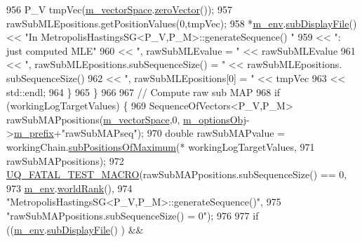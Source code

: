 \begin{DoxyCode}
956         P\_V tmpVec(\hyperlink{class_q_u_e_s_o_1_1_metropolis_hastings_s_g_a2ef17fbfc6a156f03bbfad044b5a75f5}{m\_vectorSpace}.\hyperlink{class_q_u_e_s_o_1_1_vector_space_a92e963bb5cab3eecd290dfe4b8f03b04}{zeroVector}());
957         rawSubMLEpositions.getPositionValues(0,tmpVec);
958         *\hyperlink{class_q_u_e_s_o_1_1_metropolis_hastings_s_g_ac8ea061e55b920e0c8f9bce5c3f20e52}{m\_env}.\hyperlink{class_q_u_e_s_o_1_1_base_environment_a8a0064746ae8dddfece4229b9ad374d6}{subDisplayFile}() << \textcolor{stringliteral}{"In MetropolisHastingsSG<P\_V,P\_M>::generateSequence()
      "}
959                                 << \textcolor{stringliteral}{": just computed MLE"}
960                                 << \textcolor{stringliteral}{", rawSubMLEvalue = "}                       << rawSubMLEvalue
961                                 << \textcolor{stringliteral}{", rawSubMLEpositions.subSequenceSize() = "} << rawSubMLEpositions.
      subSequenceSize()
962                                 << \textcolor{stringliteral}{", rawSubMLEpositions[0] = "}                << tmpVec
963                                 << std::endl;
964       \}
965     \}
966 
967     \textcolor{comment}{// Compute raw sub MAP}
968     \textcolor{keywordflow}{if} (workingLogTargetValues) \{
969       SequenceOfVectors<P\_V,P\_M> rawSubMAPpositions(\hyperlink{class_q_u_e_s_o_1_1_metropolis_hastings_s_g_a2ef17fbfc6a156f03bbfad044b5a75f5}{m\_vectorSpace},0,
      \hyperlink{class_q_u_e_s_o_1_1_metropolis_hastings_s_g_a5d0bc9f73d50d272aa6bfb5ef5939ef3}{m\_optionsObj}->\hyperlink{class_q_u_e_s_o_1_1_metropolis_hastings_s_g_options_a4f7c510aaa530336d24259e2a89f5d0b}{m\_prefix}+\textcolor{stringliteral}{"rawSubMAPseq"});
970       \textcolor{keywordtype}{double} rawSubMAPvalue = workingChain.\hyperlink{class_q_u_e_s_o_1_1_base_vector_sequence_a971e9e1a87e4eb47b4910348a6b437d5}{subPositionsOfMaximum}(*
      workingLogTargetValues,
971                                                                  rawSubMAPpositions);
972       \hyperlink{_defines_8h_a56d63d18d0a6d45757de47fcc06f574d}{UQ\_FATAL\_TEST\_MACRO}(rawSubMAPpositions.subSequenceSize() == 0,
973                           \hyperlink{class_q_u_e_s_o_1_1_metropolis_hastings_s_g_ac8ea061e55b920e0c8f9bce5c3f20e52}{m\_env}.\hyperlink{class_q_u_e_s_o_1_1_base_environment_a78b57112bbd0e6dd0e8afec00b40ffa7}{worldRank}(),
974                           \textcolor{stringliteral}{"MetropolisHastingsSG<P\_V,P\_M>::generateSequence()"},
975                           \textcolor{stringliteral}{"rawSubMAPpositions.subSequenceSize() = 0"});
976 
977       \textcolor{keywordflow}{if} ((\hyperlink{class_q_u_e_s_o_1_1_metropolis_hastings_s_g_ac8ea061e55b920e0c8f9bce5c3f20e52}{m\_env}.\hyperlink{class_q_u_e_s_o_1_1_base_environment_a8a0064746ae8dddfece4229b9ad374d6}{subDisplayFile}()                   ) &&

\end{DoxyCode}
